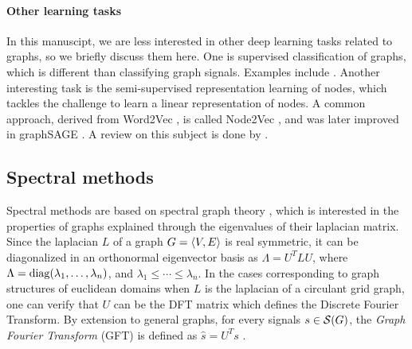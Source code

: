 \paragraph{Other learning tasks}
In this manuscipt, we are less interested in other deep learning tasks related to graphs, so we briefly discuss them here. One is supervised classification of graphs, which is different than classifying graph signals. Examples include \citep{niepert2016learning,tixier2017classifying}. Another interesting task is the semi-supervised representation learning of nodes, which tackles the challenge to learn a linear representation of nodes. A common approach, derived from Word2Vec \citep{mikolov2013efficient,mikolov2013distributed}, is called Node2Vec \citep{grover2016node2vec}, and was later improved in graphSAGE \citep{hamilton2017inductive}. A review on this subject is done by \cite{hamilton2017representation}.

\subsection{Spectral methods}
\label{sec:spec}

Spectral methods are based on spectral graph theory \citep{chung1996spectral}, which is interested in the properties of graphs explained through the eigenvalues of their laplacian matrix. Since the laplacian $L$ of a graph $G = \langle V, E \rangle$ is real symmetric, it can be diagonalized in an orthonormal eigenvector basis as $\Lambda = U^TLU$, where $\Lambda = \operatorname{diag}(\lambda_1, \ldots, \lambda_n)$, and $\lambda_1 \le \cdots \le \lambda_n$.
In the cases corresponding to graph structures of euclidean domains \ie when $L$ is the laplacian of a circulant grid graph, one can verify that $U$ can be the DFT matrix which defines the Discrete Fourier Transform. By extension to general graphs, for every signals $s \in \mathcal{S}(G)$, the \emph{Graph Fourier Transform} (GFT) is defined as $\hat{s} = U^Ts$ \citep{shuman2013emerging}.


